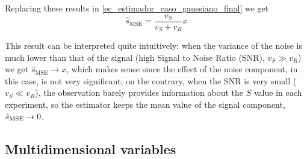 \begin{example}
Replacing these results in \eqref{ec_estimador_caso_gaussiano_final} we get
\begin{equation}
\hat s_{\text{MSE}} = \frac{v_S}{v_S + v_R} x
\end{equation}

This result can be interpreted quite intuitively: when the variance of the noise is much lower than that of the signal (high Signal to Noise Ratio (SNR), $v_S \gg v_R$) we get $\hat s_{\text{MSE}} \to x$, which makes sense since the effect of the noise component, in this case, is not very significant; on the contrary, when the SNR is very small ($v_S \ll v_R$), the observation barely provides information about the $S$ value in each experiment, so the estimator keeps the mean value of the signal component, $\hat{s}_\text{MSE} \to 0$.
\end{example} %


\subsection{Multidimensional variables}

